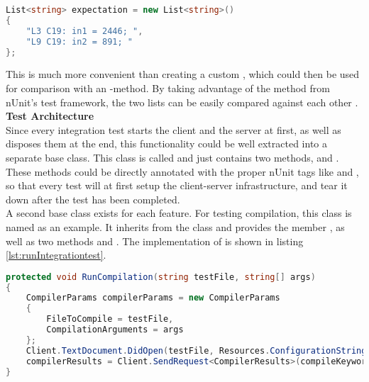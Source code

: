 \begin{lstlisting}[language=csharp, caption={Expectation}, captionpos=b, label={lst:testexpectation}]
List<string> expectation = new List<string>()
{
    "L3 C19: in1 = 2446; ",
    "L9 C19: in2 = 891; "
};
\end{lstlisting}

This is much more convenient than creating a custom , which could then be used for comparison with an -method.
By taking advantage of the method \linebreak
{} from nUnit's test framework,
the two lists can be easily compared against each other \cite{nunitCollectionAssert}.  \\

\textbf{Test Architecture}\\
Since every integration test starts the client and the server at first, as well as disposes them at the end,
this functionality could be well extracted into a separate base class.
This class is called  and just contains two methods,  and .
These methods could be directly annotated with the proper nUnit tags like \code{[SetUp]} and \code{[TearDown]},
so that every test will at first setup the client-server infrastructure,
and tear it down after the test has been completed.\\

A second base class exists for each feature.
For testing compilation, this class is named  as an example.
It inherits from the  class and provides the member \linebreak {},
as well as two methods  and .
The implementation of  is shown in listing \ref{lst:runIntegrationtest}.\\

\begin{lstlisting}[language=csharp, caption={Running a Compilation Integration test}, captionpos=b, label={lst:runIntegrationtest}]
protected void RunCompilation(string testFile, string[] args)
{
    CompilerParams compilerParams = new CompilerParams
    {
        FileToCompile = testFile,
        CompilationArguments = args
    };
    Client.TextDocument.DidOpen(testFile, Resources.ConfigurationStrings.DafnyFileEnding);
    compilerResults = Client.SendRequest<CompilerResults>(compileKeyword, compilerParams, CancellationSource.Token).Result;
}
\end{lstlisting}

